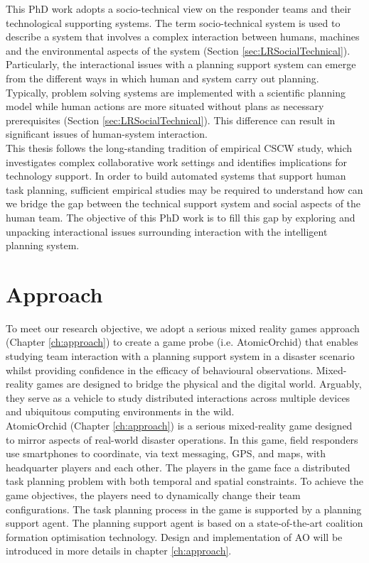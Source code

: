 This PhD work adopts a socio-technical view on the responder teams and their technological supporting systems. The term socio-technical system is used to describe a system that involves a complex interaction between humans, machines and the environmental aspects of the system (Section \ref{sec:LRSocialTechnical}). Particularly, the interactional issues with a planning support system can emerge from the different ways in which human and system carry out planning. Typically, problem solving systems are implemented with a scientific planning model while human actions are more situated without plans as necessary prerequisites (Section \ref{sec:LRSocialTechnical}). This difference can result in significant issues of human-system interaction.\\

This thesis follows the long-standing tradition of empirical \ac{CSCW} study, which investigates complex collaborative work settings and identifies implications for technology support. In order to build automated systems that support human task planning, sufficient empirical studies may be required to understand how can we bridge the gap between the technical support system and social aspects of the human team.  The objective of this PhD work is to fill this gap by exploring and unpacking interactional issues surrounding interaction with the intelligent planning system.\\

\section{Approach}\label{sec:custom}


To meet our research objective, we adopt a serious mixed reality games approach (Chapter \ref{ch:approach}) to create a game probe (i.e. AtomicOrchid) that enables studying team interaction with a planning support system in a disaster scenario whilst providing confidence in the efficacy of behavioural observations. Mixed-reality games are designed to bridge the physical and the digital world. Arguably, they serve as a vehicle to study distributed interactions across multiple devices and ubiquitous computing environments in the wild.\\

AtomicOrchid (Chapter \ref{ch:approach}) is a serious mixed-reality game designed to mirror aspects of real-world disaster operations. In this game, field responders use smartphones to coordinate, via text messaging, GPS, and maps, with headquarter players and each other. The players in the game face a distributed task planning problem with both temporal and spatial constraints. To achieve the game objectives, the players need to dynamically change their team configurations. The task planning process in the game is supported by a planning support agent. The planning support agent is based on a state-of-the-art coalition formation optimisation technology. Design and implementation of \acf{AO} will be introduced in more details in chapter \ref{ch:approach}.\\

